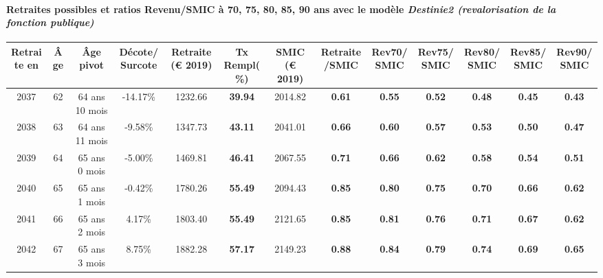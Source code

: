 \paragraph{Retraites possibles et ratios Revenu/SMIC à 70, 75, 80, 85, 90 ans avec le modèle \emph{Destinie2 (revalorisation de la fonction publique)}}  
 
{ \scriptsize \begin{center} 
\begin{tabular}[htb]{|c|c||c|c||c|c||c||c|c|c|c|c|c|} 
\hline 
 Retraite en &  Âge &  Âge pivot &  Décote/Surcote &  Retraite (\euro{} 2019) &  Tx Rempl(\%) &  SMIC (\euro{} 2019) &  Retraite/SMIC &  Rev70/SMIC &  Rev75/SMIC &  Rev80/SMIC &  Rev85/SMIC &  Rev90/SMIC \\ 
\hline \hline 
 2037 &  62 &  64 ans 10 mois &  -14.17\% &  1232.66 &  {\bf 39.94} &  2014.82 &  {\bf {\color{red} 0.61}} &  {\bf {\color{red} 0.55}} &  {\bf {\color{red} 0.52}} &  {\bf {\color{red} 0.48}} &  {\bf {\color{red} 0.45}} &  {\bf {\color{red} 0.43}} \\ 
\hline 
 2038 &  63 &  64 ans 11 mois &  -9.58\% &  1347.73 &  {\bf 43.11} &  2041.01 &  {\bf {\color{red} 0.66}} &  {\bf {\color{red} 0.60}} &  {\bf {\color{red} 0.57}} &  {\bf {\color{red} 0.53}} &  {\bf {\color{red} 0.50}} &  {\bf {\color{red} 0.47}} \\ 
\hline 
 2039 &  64 &  65 ans 0 mois &  -5.00\% &  1469.81 &  {\bf 46.41} &  2067.55 &  {\bf {\color{red} 0.71}} &  {\bf {\color{red} 0.66}} &  {\bf {\color{red} 0.62}} &  {\bf {\color{red} 0.58}} &  {\bf {\color{red} 0.54}} &  {\bf {\color{red} 0.51}} \\ 
\hline 
 2040 &  65 &  65 ans 1 mois &  -0.42\% &  1780.26 &  {\bf 55.49} &  2094.43 &  {\bf {\color{red} 0.85}} &  {\bf {\color{red} 0.80}} &  {\bf {\color{red} 0.75}} &  {\bf {\color{red} 0.70}} &  {\bf {\color{red} 0.66}} &  {\bf {\color{red} 0.62}} \\ 
\hline 
 2041 &  66 &  65 ans 2 mois &  4.17\% &  1803.40 &  {\bf 55.49} &  2121.65 &  {\bf {\color{red} 0.85}} &  {\bf {\color{red} 0.81}} &  {\bf {\color{red} 0.76}} &  {\bf {\color{red} 0.71}} &  {\bf {\color{red} 0.67}} &  {\bf {\color{red} 0.62}} \\ 
\hline 
 2042 &  67 &  65 ans 3 mois &  8.75\% &  1882.28 &  {\bf 57.17} &  2149.23 &  {\bf {\color{red} 0.88}} &  {\bf {\color{red} 0.84}} &  {\bf {\color{red} 0.79}} &  {\bf {\color{red} 0.74}} &  {\bf {\color{red} 0.69}} &  {\bf {\color{red} 0.65}} \\ 
\hline 
\hline 
\end{tabular} 
\end{center} } 


